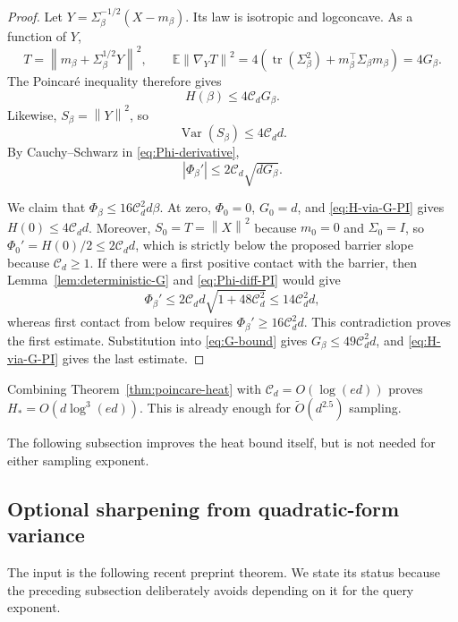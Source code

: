\documentclass[11pt]{article}
\theoremstyle{remark}
\newcommand{\E}{\mathbb E}
\newcommand{\1}{\bm 1}
\newcommand{\Var}{\operatorname{Var}}
\newcommand{\tr}{\operatorname{tr}}
\newcommand{\norm}[1]{\left\lVert #1\right\rVert}
\newcommand{\abs}[1]{\left|#1\right|}
\begin{document}
\begin{proof}
Let
$Y=\Sigma_\beta^{-1/2}(X-m_\beta)$.  Its law is isotropic and
logconcave.  As a function of $Y$,
\[
  T=\norm{m_\beta+\Sigma_\beta^{1/2}Y}^2,
  \qquad
  \E\norm{\nabla_YT}^2
  =4\left(\tr(\Sigma_\beta^2)
      +m_\beta^\top\Sigma_\beta m_\beta\right)
  =4G_\beta.
\]
The Poincar\'e inequality therefore gives
\begin{equation}\label{eq:H-via-G-PI}
  H(\beta)\leq4\mathcal C_dG_\beta.
\end{equation}
Likewise, $S_\beta=\norm Y^2$, so
\begin{equation}\label{eq:S-variance-PI}
  \Var(S_\beta)\leq4\mathcal C_dd.
\end{equation}
By Cauchy--Schwarz in \eqref{eq:Phi-derivative},
\begin{equation}\label{eq:Phi-diff-PI}
  \abs{\Phi_\beta'}
  \leq2\mathcal C_d\sqrt{dG_\beta}.
\end{equation}

  We claim that
  $\Phi_\beta\leq16\mathcal C_d^2d\beta$.  At zero,
  $\Phi_0=0$, $G_0=d$, and \eqref{eq:H-via-G-PI} gives
  $H(0)\leq4\mathcal C_dd$.  Moreover, $S_0=T=\norm X^2$ because
  $m_0=0$ and $\Sigma_0=I$, so
  $\Phi_0'=H(0)/2\leq2\mathcal C_dd$, which is strictly below the
proposed barrier slope because $\mathcal C_d\geq1$.  If there were a
first positive contact with the barrier, then
Lemma~\ref{lem:deterministic-G} and \eqref{eq:Phi-diff-PI} would give
\[
  \Phi_\beta'
  \leq2\mathcal C_dd\sqrt{1+48\mathcal C_d^2}
  \leq14\mathcal C_d^2d,
\]
whereas first contact from below requires
$\Phi_\beta'\geq16\mathcal C_d^2d$.  This contradiction proves the
first estimate.  Substitution into \eqref{eq:G-bound} gives
$G_\beta\leq49\mathcal C_d^2d$, and
\eqref{eq:H-via-G-PI} gives the last estimate.
\end{proof}

Combining Theorem~\ref{thm:poincare-heat} with
$\mathcal C_d=O(\log(ed))$ proves
$H_*=O(d\log^3(ed))$.  This is already enough for
$\widetilde O(d^{2.5})$ sampling.

The following subsection improves the heat bound itself, but is not
needed for either sampling exponent.

\subsection{Optional sharpening from quadratic-form variance}

The input is the following recent preprint theorem.  We state its
status because the preceding subsection deliberately avoids depending
on it for the query exponent.
\end{document}
